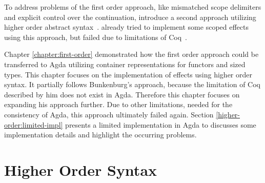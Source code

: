
To address problems of the first order approach, like mismatched scope
delimiters and explicit control over the continuation,
\citeauthor{DBLP:conf/haskell/WuSH14} introduce a second approach utilizing
higher order abstract syntax~\cite{DBLP:conf/haskell/WuSH14}.
\citeauthor{bunkenburg2019modeling} already tried to implement some scoped
effects using this approach, but failed due to limitations of
Coq~\cite{bunkenburg2019modeling}.

Chapter \ref{chapter:first-order} demonstrated how the first order approach
could be transferred to Agda utilizing container representations for functors
and sized types.
This chapter focuses on the implementation of effects using higher order syntax.
It partially follows Bunkenburg's approach, because the limitation of Coq
described by him does not exist in Agda.
Therefore this chapter focuses on expanding his approach further.
Due to other limitations, needed for the consistency of Agda, this approach
ultimately failed again.
Section \ref{higher-order:limited-impl} presents a limited implementation in
Agda to discusses some implementation details and highlight the occurring
problems.


\section{Higher Order Syntax}
\label{higher-order:syntax}

